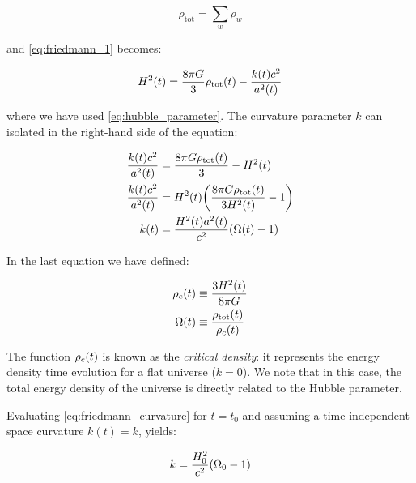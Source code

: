 \begin{equation}
        \rho_{\text{tot}} = \sum_w \rho_w
\end{equation}

and \autoref{eq:friedmann_1} becomes:

\begin{equation}
        H^2\qty(t) = \frac{8\pi G}{3} \rho_{\text{tot}}\qty(t) -
        \frac{k\qty(t) c^2}{a^2\qty(t)}
\end{equation}

where we have used \autoref{eq:hubble_parameter}. The curvature parameter
$k$ can isolated in the right-hand side of the equation:

\begin{equation}
        \begin{split}
                \frac{k\qty(t) c^2}{a^2\qty(t)} & =
                \frac{8\pi G \rho_{\text{tot}}\qty(t)}{3} - H^2\qty(t) \\
                \frac{k\qty(t) c^2}{a^2\qty(t)} & =
                H^2\qty(t) \qty(\frac{8\pi G \rho_{\text{tot}}\qty(t)}{3H^2\qty(t)} - 1) \\
                k(t) & = \frac{H^2\qty(t) a^2\qty(t)}{c^2} \qty(\Omega\qty(t) - 1) \\
        \end{split}
        \label{eq:friedmann_curvature}
\end{equation}

In the last equation we have defined:

\begin{align}
        \rho_c\qty(t) & \equiv \frac{3H^2\qty(t)}{8\pi G} \\
        \Omega\qty(t) & \equiv \frac{\rho_{\text{tot}}\qty(t)}{\rho_c\qty(t)}
\end{align}

The function $\rho_c\qty(t)$ is known as the \emph{critical density}: it
represents the energy density time evolution for a flat universe ($k = 0$).
We note that in this case, the total energy density of the universe is
directly related to the Hubble parameter.

Evaluating \autoref{eq:friedmann_curvature} for $t = t_0$ and assuming a
time independent space curvature $k(t) = k$, yields:

\begin{equation}
        k = \frac{H^2_0}{c^2} \qty(\Omega_0 - 1) \\
\end{equation}

